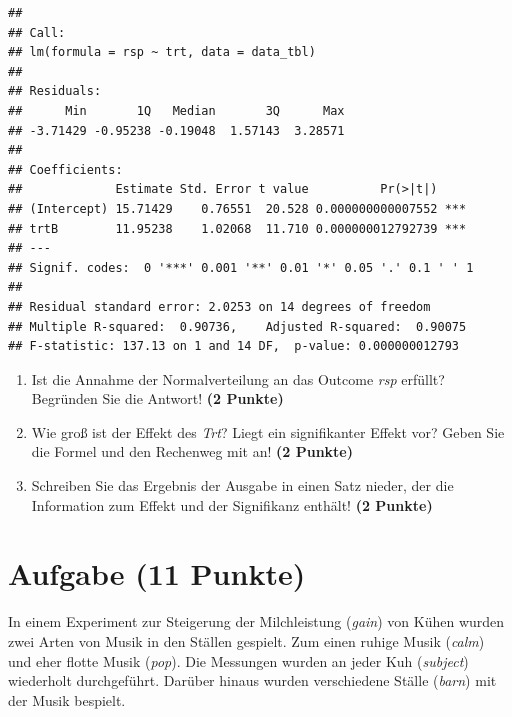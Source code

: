 \documentclass[a4paper, 10pt]{scrartcl}\usepackage[]{graphicx}\usepackage[]{color}
\makeatletter
\newenvironment{kframe}{%
 \def\at@end@of@kframe{}%
 \ifinner\ifhmode%
  \def\at@end@of@kframe{\end{minipage}}%
  \begin{minipage}{\columnwidth}%
 \fi\fi%
 \def\FrameCommand##1{\hskip\@totalleftmargin \hskip-\fboxsep
 \colorbox{shadecolor}{##1}\hskip-\fboxsep
     \hskip-\linewidth \hskip-\@totalleftmargin \hskip\columnwidth}%
 \MakeFramed {\advance\hsize-\width
   \@totalleftmargin\z@ \linewidth\hsize
   \@setminipage}}%
 {\par\unskip\endMakeFramed%
 \at@end@of@kframe}
\newenvironment{knitrout}{}{} %
\makeatother
\begin{document}
\begin{knitrout}
\color{fgcolor}\begin{kframe}
\begin{verbatim}
## 
## Call:
## lm(formula = rsp ~ trt, data = data_tbl)
## 
## Residuals:
##      Min       1Q   Median       3Q      Max 
## -3.71429 -0.95238 -0.19048  1.57143  3.28571 
## 
## Coefficients:
##             Estimate Std. Error t value          Pr(>|t|)    
## (Intercept) 15.71429    0.76551  20.528 0.000000000007552 ***
## trtB        11.95238    1.02068  11.710 0.000000012792739 ***
## ---
## Signif. codes:  0 '***' 0.001 '**' 0.01 '*' 0.05 '.' 0.1 ' ' 1
## 
## Residual standard error: 2.0253 on 14 degrees of freedom
## Multiple R-squared:  0.90736,	Adjusted R-squared:  0.90075 
## F-statistic: 137.13 on 1 and 14 DF,  p-value: 0.000000012793
\end{verbatim}
\end{kframe}
\end{knitrout}


\begin{enumerate}
\item Ist die Annahme der Normalverteilung an das Outcome \textit{rsp} erf{\"u}llt?
  Begr{\"u}nden Sie die Antwort! \textbf{(2 Punkte)}
\item Wie gro{\ss} ist der Effekt des \textit{Trt}? Liegt ein signifikanter
  Effekt vor? Geben Sie die Formel und den Rechenweg mit an! \textbf{(2 Punkte)}
\item Schreiben Sie das Ergebnis der \Rlogo Ausgabe in einen Satz nieder, der die
  Information zum Effekt und der Signifikanz enth{\"a}lt! \textbf{(2 Punkte)} 
\end{enumerate}
 
\clearpage

\section{Aufgabe \hfill (11 Punkte)}

In einem Experiment zur Steigerung der Milchleistung (\textit{gain}) von
K{\"u}hen wurden zwei Arten von Musik in den St{\"a}llen gespielt. Zum einen ruhige
Musik (\textit{calm}) und eher flotte Musik (\textit{pop}). Die Messungen
wurden an jeder Kuh (\textit{subject}) wiederholt durchgef{\"u}hrt. Dar{\"u}ber
hinaus wurden verschiedene St{\"a}lle (\textit{barn}) mit der Musik bespielt.
\end{document}
